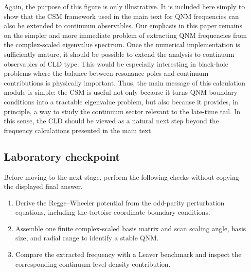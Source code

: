Again, the purpose of this figure is only illustrative.
It is included here simply to show that the CSM framework used in the main text
for QNM frequencies can also be extended to continuum observables.
Our emphasis in this paper remains on the simpler and more immediate
problem of extracting QNM frequencies from the complex-scaled eigenvalue
spectrum.
Once the numerical implementation is sufficiently mature, it should be
possible to extend the analysis to continuum observables of CLD type.
This would be especially interesting in black-hole problems where the balance
between resonance poles and continuum contributions is physically important.
Thus, the main message of this calculation module is simple:
the CSM is useful not only because it turns QNM boundary conditions into a
tractable eigenvalue problem, but also because it provides, in principle, a
way to study the continuum sector relevant to the late-time tail.
In this sense, the CLD should be viewed as a natural next step beyond the
frequency calculations presented in the main text.

\subsection*{Laboratory checkpoint}
Before moving to the next stage, perform the following checks without copying
the displayed final answer.
\begin{enumerate}
  \item Derive the Regge--Wheeler potential from the odd-parity perturbation equations, including the tortoise-coordinate boundary conditions.
  \item Assemble one finite complex-scaled basis matrix and scan scaling angle, basis size, and radial range to identify a stable QNM.
  \item Compare the extracted frequency with a Leaver benchmark and inspect the corresponding continuum-level-density contribution.
\end{enumerate}
